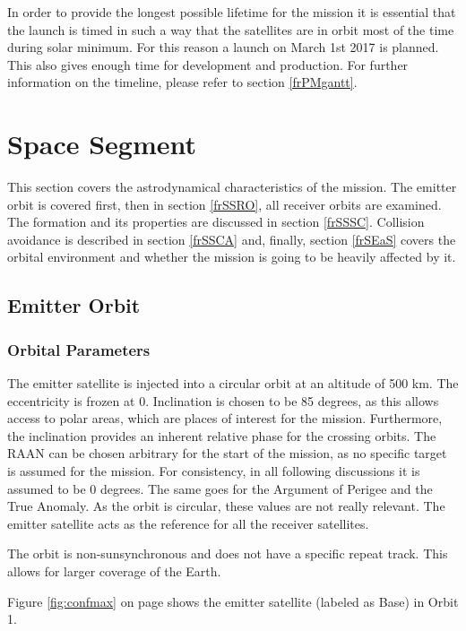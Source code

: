 In order to provide the longest possible lifetime for the mission it is essential that the launch is timed in such a way that the satellites are in orbit most of the time during solar minimum. For this reason a launch on March 1st 2017 is planned. This also gives enough time for development and production. For further information on the timeline, please refer to section \ref{frPMgantt}.

\section{Space Segment}
\label{frSS}

This section covers the astrodynamical characteristics of the mission. The emitter orbit is covered first, then in section \ref{frSSRO}, all receiver orbits are examined. The formation and its properties are discussed in section \ref{frSSSC}. Collision avoidance is described in section \ref{frSSCA} and, finally, section \ref{frSEaS} covers the orbital environment and whether the mission is going to be heavily affected by it. 

\subsection{Emitter Orbit}
\label{frSSEOD}

\subsubsection{Orbital Parameters}
\label{frSSEODOP}

The emitter satellite is injected into a circular orbit at an altitude of 500 km. The eccentricity is frozen at 0. Inclination is chosen to be 85 degrees, as this allows access to polar areas, which are places of interest for the mission. Furthermore, the inclination provides an inherent relative phase for the crossing orbits. The \acl{RAAN} can be chosen arbitrary for the start of the mission, as no specific target is assumed for the mission. For consistency, in all following discussions it is assumed to be 0 degrees. The same goes for the Argument of Perigee and the True Anomaly. As the orbit is circular, these values are not really relevant. The emitter satellite acts as the reference for all the receiver satellites.

The orbit is non-sunsynchronous and does not have a specific repeat track. This allows for larger coverage of the Earth. 

Figure \ref{fig:confmax} on page \pageref{fig:confmax} shows the emitter satellite (labeled as Base) in Orbit 1.

